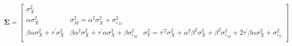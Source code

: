 \begin{equation}
	\label{eq:Sigma}
	\boldsymbol{\Sigma} =
	\left[
		\begin{array}{ccc}
			\sigma_{X}^{2} & & \\
			\alpha \sigma_{X}^{2}
			& \sigma_{M}^{2} = \alpha^2 \sigma_{X}^{2} + \sigma_{\varepsilon_{M}}^{2} & \\
			\beta \alpha \sigma_{X}^{2} + \tau^{\prime} \sigma_{X}^{2}
			& \beta \alpha^{2} \sigma_{X}^{2} + \tau^{\prime} \alpha \sigma_{X}^{2} + \beta \sigma_{\varepsilon_{M}}^{2}
			& \sigma_{Y}^{2} = \tau^{\prime 2} \sigma_{X}^{2} + \alpha^2 \beta^2 \sigma_{X}^{2} + \beta^2 \sigma_{\varepsilon_{M}}^{2} + 2 \tau^{\prime} \beta \alpha \sigma_{X}^{2} + \sigma_{\varepsilon_{Y}}^{2} \\
		\end{array}
		\right]
\end{equation}
